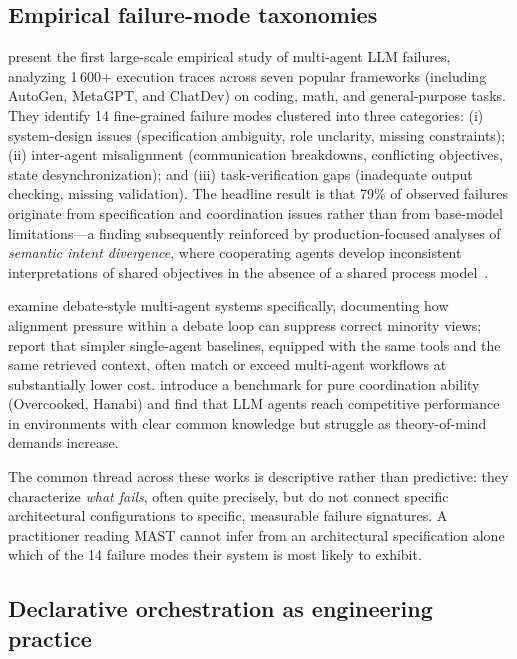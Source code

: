 \documentclass[11pt]{article}
\begin{document}
\subsection{Empirical failure-mode taxonomies}
\label{sec:related-failures}

\citet{cemri2025mast} present the first large-scale empirical study of multi-agent LLM failures, analyzing 1\,600+ execution traces across seven popular frameworks (including AutoGen, MetaGPT, and ChatDev) on coding, math, and general-purpose tasks. They identify 14 fine-grained failure modes clustered into three categories: (i) system-design issues (specification ambiguity, role unclarity, missing constraints); (ii) inter-agent misalignment (communication breakdowns, conflicting objectives, state desynchronization); and (iii) task-verification gaps (inadequate output checking, missing validation). The headline result is that 79\% of observed failures originate from specification and coordination issues rather than from base-model limitations---a finding subsequently reinforced by production-focused analyses of \emph{semantic intent divergence}, where cooperating agents develop inconsistent interpretations of shared objectives in the absence of a shared process model~\citep{sid2026}.

\citet{wynn2025talk} examine debate-style multi-agent systems specifically, documenting how alignment pressure within a debate loop can suppress correct minority views; \citet{xu2026rethinking} report that simpler single-agent baselines, equipped with the same tools and the same retrieved context, often match or exceed multi-agent workflows at substantially lower cost. \citet{agashe2025llmcoord} introduce a benchmark for pure coordination ability (Overcooked, Hanabi) and find that LLM agents reach competitive performance in environments with clear common knowledge but struggle as theory-of-mind demands increase.

The common thread across these works is descriptive rather than predictive: they characterize \emph{what fails}, often quite precisely, but do not connect specific architectural configurations to specific, measurable failure signatures. A practitioner reading MAST cannot infer from an architectural specification alone which of the 14 failure modes their system is most likely to exhibit.

\subsection{Declarative orchestration as engineering practice}
\label{sec:related-orchestration}
\end{document}
